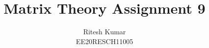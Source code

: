 \documentclass[journal,12pt,twocolumn]{IEEEtran}
\DeclareMathOperator*{\Res}{Res}
\begin{document}
	
	
	\newtheorem{theorem}{Theorem}[section]
	\newtheorem{problem}{Problem}
	\newtheorem{proposition}{Proposition}[section]
	\newtheorem{lemma}{Lemma}[section]
	\newtheorem{corollary}[theorem]{Corollary}
	\newtheorem{example}{Example}[section]
	\newtheorem{definition}[problem]{Definition}
	
	\newcommand{\BEQA}{\begin{eqnarray}}
	\newcommand{\EEQA}{\end{eqnarray}}
	\newcommand{\define}{\stackrel{\triangle}{=}}
	
	\providecommand{\mbf}{\mathbf}
	\providecommand{\pr}[1]{\ensuremath{\Pr\left(#1\right)}}
	\providecommand{\qfunc}[1]{\ensuremath{Q\left(#1\right)}}
	\providecommand{\sbrak}[1]{\ensuremath{{}\left[#1\right]}}
	\providecommand{\lsbrak}[1]{\ensuremath{{}\left[#1\right.}}
	\providecommand{\rsbrak}[1]{\ensuremath{{}\left.#1\right]}}
	\providecommand{\brak}[1]{\ensuremath{\left(#1\right)}}
	\providecommand{\lbrak}[1]{\ensuremath{\left(#1\right.}}
	\providecommand{\rbrak}[1]{\ensuremath{\left.#1\right)}}
	\providecommand{\cbrak}[1]{\ensuremath{\left\{#1\right\}}}
	\providecommand{\lcbrak}[1]{\ensuremath{\left\{#1\right.}}
	\providecommand{\rcbrak}[1]{\ensuremath{\left.#1\right\}}}
	\theoremstyle{remark}
	\newtheorem{rem}{Remark}
	\newcommand{\sgn}{\mathop{\mathrm{sgn}}}
	\providecommand{\abs}[1]{\left\vert#1\right\vert}
	\providecommand{\res}[1]{\Res\displaylimits_{#1}} 
	\providecommand{\norm}[1]{\left\lVert#1\right\rVert}
	\providecommand{\mtx}[1]{\mathbf{#1}}
	\providecommand{\mean}[1]{E\left[ #1 \right]}
	\providecommand{\fourier}{\overset{\mathcal{F}}{ \rightleftharpoons}}
	\providecommand{\system}{\overset{\mathcal{H}}{ \longleftrightarrow}}
	\newcommand{\solution}{\noindent \textbf{Solution: }}
	\newcommand{\cosec}{\,\text{cosec}\,}
	\providecommand{\dec}[2]{\ensuremath{\overset{#1}{\underset{#2}{\gtrless}}}}
	\newcommand{\myvec}[1]{\ensuremath{\begin{pmatrix}#1\end{pmatrix}}}
	\newcommand{\mydet}[1]{\ensuremath{\begin{vmatrix}#1\end{vmatrix}}}
	\makeatletter
	\makeatother
	\let\StandardTheFigure\thefigure
	\let\vec\mathbf
	\renewcommand{\thefigure}{\theproblem}
	\def\putbox#1#2#3{\makebox[0in][l]{\makebox[#1][l]{}\raisebox{\baselineskip}[0in][0in]{\raisebox{#2}[0in][0in]{#3}}}}
	\def\rightbox#1{\makebox[0in][r]{#1}}
	\def\centbox#1{\makebox[0in]{#1}}
	\def\topbox#1{\raisebox{-\baselineskip}[0in][0in]{#1}}
	\def\midbox#1{\raisebox{-0.5\baselineskip}[0in][0in]{#1}}
	\vspace{3cm}
	\title{Matrix Theory Assignment 9}
	\author{Ritesh Kumar \\ EE20RESCH11005}
	
\end{document}

